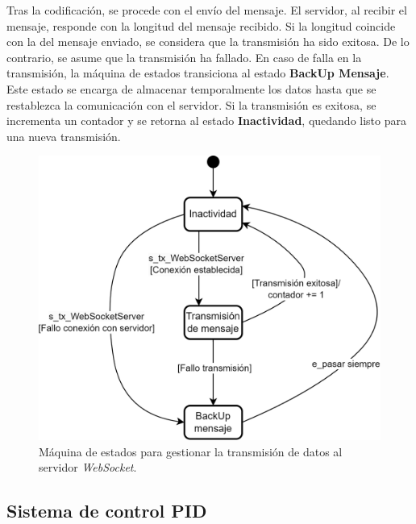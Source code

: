 Tras la codificación, se procede con el envío del mensaje. El servidor, al recibir el mensaje, responde con la longitud del mensaje recibido. Si la longitud coincide con la del mensaje enviado, se considera que la transmisión ha sido exitosa. De lo contrario, se asume que la transmisión ha fallado. En caso de falla en la transmisión, la máquina de estados transiciona al estado \textbf{BackUp Mensaje}. Este estado se encarga de almacenar temporalmente los datos hasta que se restablezca la comunicación con el servidor. Si la transmisión es exitosa, se incrementa un contador y se retorna al estado \textbf{Inactividad}, quedando listo para una nueva transmisión.


\begin{figure}[H]
    \centering
    \includegraphics[width=0.7\linewidth]{Figuras/datalogger/Firmware/sc_transmisionServer.png}
    \caption{Máquina de estados para gestionar la transmisión de datos al servidor \textit{WebSocket}.}
    \label{fig:sc_transmisionServer}
\end{figure}


\subsection{Sistema de control PID}\label{sec:sistemaDeControlPid}


